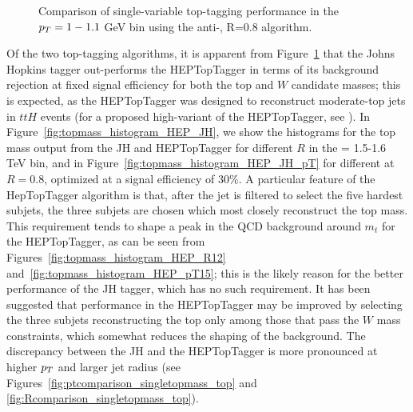 \begin{figure}
\centering
{}
\caption{Comparison of single-variable top-tagging performance in the $p_T= 1-1.1$ GeV bin using the anti-\kT, R=0.8 algorithm.}
\label{fig:single_variable_ROC}
\end{figure}

Of the two top-tagging algorithms, it is apparent from Figure~\ref{fig:single_variable_ROC} that the Johns Hopkins tagger out-performs the HEPTopTagger in terms of its background rejection at fixed signal efficiency for both the top and $W$ candidate masses; this is expected, as the HEPTopTagger was designed to reconstruct moderate-\pt top jets in $ttH$ events (for a proposed high-\pt variant of the HEPTopTagger, see \cite{Schaetzel:2013vka}). In Figure~\ref{fig:topmass_histogram_HEP_JH}, we show the histograms for the top mass output from the JH and HEPTopTagger for different $R$ in the \pt =  1.5-1.6 TeV bin, and in Figure~\ref{fig:topmass_histogram_HEP_JH_pT} for different \pt at $R=0.8$, optimized at a signal efficiency of 30\%. 
A particular feature of the HepTopTagger algorithm is that, after the jet is filtered to select the five hardest subjets, the three subjets are chosen which most closely reconstruct the top mass. This requirement tends to shape a peak in the QCD background around $m_t$ for the HEPTopTagger, as can be seen from Figures~\ref{fig:topmass_histogram_HEP_R12} and~\ref{fig:topmass_histogram_HEP_pT15}; this is the likely reason for the better performance of the JH tagger, which has no such requirement.
It has been suggested  \cite{Anders:2013oga} that performance in the HEPTopTagger may be improved by selecting the three subjets reconstructing the top only among those that pass the $W$ mass constraints, which somewhat reduces the shaping of the background. The discrepancy between the JH and the 
HEPTopTagger is more pronounced  at higher $p_T$ and larger jet radius (see Figures~\ref{fig:ptcomparison_singletopmass_top} and \ref{fig:Rcomparison_singletopmass_top}). 

